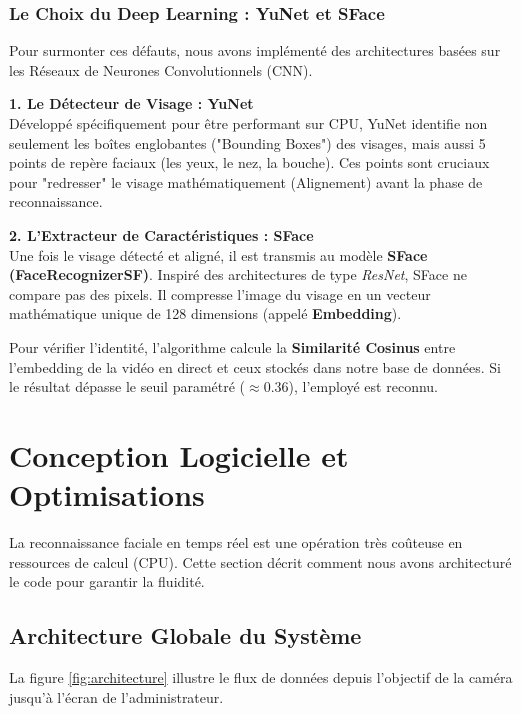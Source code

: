 \documentclass[12pt,a4paper]{report}
\begin{document}
\subsection{Le Choix du Deep Learning : YuNet et SFace}
Pour surmonter ces défauts, nous avons implémenté des architectures basées sur les Réseaux de Neurones Convolutionnels (CNN). 

\textbf{1. Le Détecteur de Visage : YuNet}\\
Développé spécifiquement pour être performant sur CPU, YuNet identifie non seulement les boîtes englobantes ("Bounding Boxes") des visages, mais aussi 5 points de repère faciaux (les yeux, le nez, la bouche). Ces points sont cruciaux pour "redresser" le visage mathématiquement (Alignement) avant la phase de reconnaissance.

\textbf{2. L'Extracteur de Caractéristiques : SFace}\\
Une fois le visage détecté et aligné, il est transmis au modèle \textbf{SFace (FaceRecognizerSF)}. Inspiré des architectures de type \textit{ResNet}, SFace ne compare pas des pixels. Il compresse l'image du visage en un vecteur mathématique unique de 128 dimensions (appelé \textbf{Embedding}). 

Pour vérifier l'identité, l'algorithme calcule la \textbf{Similarité Cosinus} entre l'embedding de la vidéo en direct et ceux stockés dans notre base de données. Si le résultat dépasse le seuil paramétré ($\approx 0.36$), l'employé est reconnu.

\chapter{Conception Logicielle et Optimisations}

La reconnaissance faciale en temps réel est une opération très coûteuse en ressources de calcul (CPU). Cette section décrit comment nous avons architecturé le code pour garantir la fluidité.

\section{Architecture Globale du Système}

La figure \ref{fig:architecture} illustre le flux de données depuis l'objectif de la caméra jusqu'à l'écran de l'administrateur.
\end{document}
